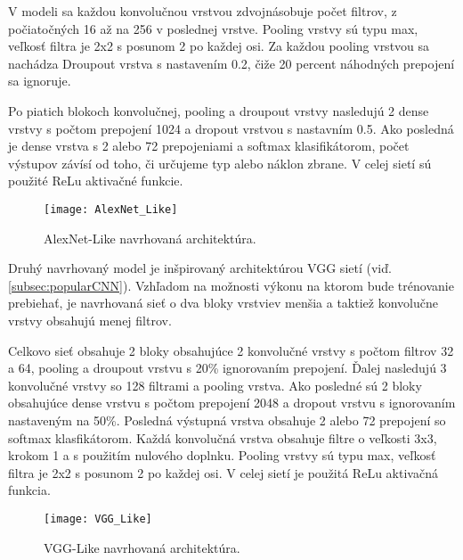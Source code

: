 V modeli sa každou konvolučnou vrstvou zdvojnásobuje počet filtrov, z počiatočných 16 až na 256 v poslednej vrstve.
Pooling vrstvy sú typu max, veľkosť filtra je 2x2 s posunom 2 po každej osi.
Za každou pooling vrstvou sa nachádza Droupout vrstva s nastavením 0.2, čiže 20 percent náhodných prepojení sa ignoruje.

Po piatich blokoch konvolučnej, pooling a droupout vrstvy nasledujú 2 dense vrstvy s počtom prepojení 1024 a dropout vrstvou s nastavním 0.5.
Ako posledná je dense vrstva s 2 alebo 72 prepojeniami a softmax klasifikátorom, počet výstupov závísí od toho, či určujeme typ alebo náklon zbrane.
V celej sietí sú použité ReLu aktivačné funkcie.

\begin{figure}[H]
    \centering
    \texttt{[image: AlexNet\_Like]}
    \caption{AlexNet-Like navrhovaná architektúra.}
    \label{pic:kNN}
\end{figure}


Druhý navrhovaný model je inšpirovaný architektúrou VGG sietí (viď. \ref{subsec:popularCNN}).
Vzhľadom na možnosti výkonu na ktorom bude trénovanie prebiehať, je navrhovaná sieť o dva bloky vrstviev menšia a taktiež konvolučne vrstvy obsahujú menej filtrov.

Celkovo sieť obsahuje 2 bloky obsahujúce 2 konvolučné vrstvy s počtom filtrov 32 a 64, pooling a droupout vrstvu s 20\% ignorovaním prepojení.
Ďalej nasledujú 3 konvolučné vrstvy so 128 filtrami a pooling vrstva.
Ako posledné sú 2 bloky obsahujúce dense vrstvu s počtom prepojení 2048 a dropout vrstvu s ignorovaním nastaveným na 50\%.
Posledná výstupná vrstva obsahuje 2 alebo 72 prepojení so softmax klasfikátorom.
Každá konvolučná vrstva obsahuje filtre o veľkosti 3x3, krokom 1 a s použitím nulového doplnku.
Pooling vrstvy sú typu max, veľkosť filtra je 2x2 s posunom 2 po každej osi.
V celej sietí je použitá ReLu aktivačná funkcia.

\begin{figure}[H]
    \centering
    \texttt{[image: VGG\_Like]}
    \caption{VGG-Like navrhovaná architektúra.}
    \label{pic:kNN}
\end{figure}

